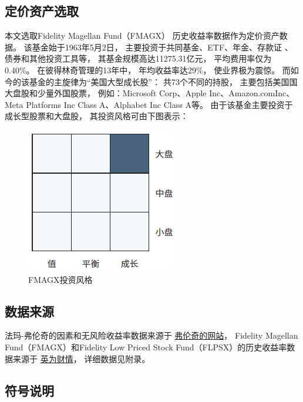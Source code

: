 \documentclass[UTF8]{ctexart}
\begin{document}
\subsection{定价资产选取}
本文选取Fidelity Magellan Fund（FMAGX）
历史收益率数据作为定价资产数据。
该基金始于1963年5月2日，
主要投资于共同基金、ETF、年金、存款证 、债券和其他投资工具等，
其基金规模高达11275.31亿元，
平均费用率仅为 0.40\%。
在彼得林奇管理的13年中，
年均收益率达29\%，
使业界极为震惊。
而如今的该基金的主旋律为“美国大型成长股”：
共73个不同的持股，
主要包括美国国大盘股和少量外国股票，
例如：Microsoft Corp、Apple Inc、Amazon.comInc、Meta Platforms Inc Class A、Alphabet Inc Class A等。
由于该基金主要投资于成长型股票和大盘股，
其投资风格可由下图表示：
\begin{figure}[H]
  \centering
  \includegraphics[scale=0.8]{pic/FMAGX投资风格.png}
  \caption{FMAGX投资风格}
\end{figure}



\subsection{数据来源}

法玛-弗伦奇的因素和无风险收益率数据来源于
\href{http://mba.tuck.dartmouth.edu/pages/faculty/ken.french/data_library.html}{弗伦奇的网站}，
Fidelity Magellan Fund（FMAGX）和Fidelity Low Priced Stock Fund（FLPSX）的历史收益率数据来源于
\href{https://cn.investing.com/funds/fidelity-magellan-historical-data}{英为财情}，
详细数据见附录。

\subsection{符号说明}
\end{document}
